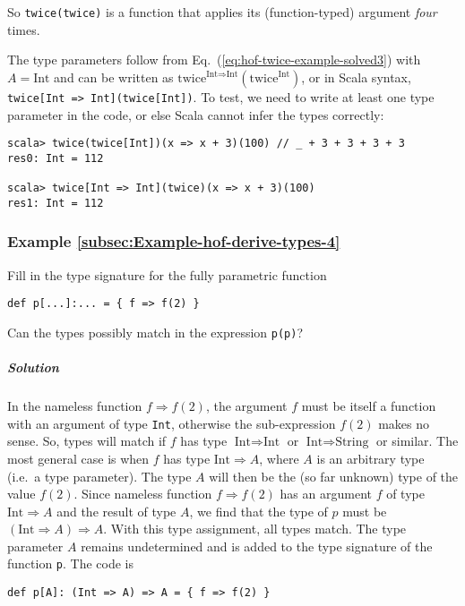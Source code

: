 So \lstinline!twice(twice)! is a function that applies its (function-typed)
argument \emph{four} times.

The type parameters follow from Eq.~(\ref{eq:hof-twice-example-solved3})
with $A=\text{Int}$ and can be written as $\text{twice}^{\text{Int}\Rightarrow\text{Int}}(\text{twice}^{\text{Int}})$,
or in Scala syntax, \lstinline!twice[Int => Int](twice[Int])!. To
test, we need to write at least one type parameter in the code, or
else Scala cannot infer the types correctly:
\begin{lstlisting}
scala> twice(twice[Int])(x => x + 3)(100) // _ + 3 + 3 + 3 + 3
res0: Int = 112

scala> twice[Int => Int](twice)(x => x + 3)(100)
res1: Int = 112
\end{lstlisting}


\subsubsection{Example \label{subsec:Example-hof-derive-types-4}\ref{subsec:Example-hof-derive-types-4}}

Fill in the type signature for the fully parametric function
\begin{lstlisting}
def p[...]:... = { f => f(2) }
\end{lstlisting}
Can the types possibly match in the expression \lstinline!p(p)!?

\subparagraph{Solution}

In the nameless function $f\Rightarrow f(2)$, the argument $f$ must
be itself a function with an argument of type \lstinline!Int!, otherwise
the sub-expression $f(2)$ makes no sense. So, types will match if
$f$ has type $\text{Int}\Rightarrow\text{Int}$ or $\text{Int}\Rightarrow\text{String}$
or similar. The most general case is when $f$ has type $\text{Int}\Rightarrow A$,
where $A$ is an arbitrary type (i.e.~a type parameter). The type
$A$ will then be the (so far unknown) type of the value $f(2)$.
Since nameless function $f\Rightarrow f(2)$ has an argument $f$
of type $\text{Int}\Rightarrow A$ and the result of type $A$, we
find that the type of $p$ must be $\left(\text{Int}\Rightarrow A\right)\Rightarrow A$.
With this type assignment, all types match. The type parameter $A$
remains undetermined and is added to the type signature of the function
\lstinline!p!. The code is
\begin{lstlisting}
def p[A]: (Int => A) => A = { f => f(2) }
\end{lstlisting}

